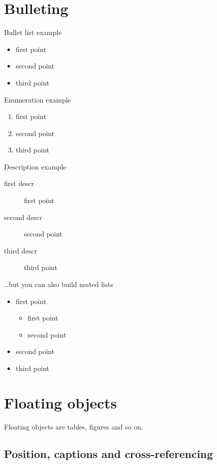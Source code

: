 \section{Bulleting}

Bullet list example
\begin{itemize}
\item first point
\item second point
\item third point \\
\end{itemize}

\noindent
Enumeration example
\begin{enumerate}
\item first point
\item second point
\item third point\\
\end{enumerate}

\noindent
Description example
\begin{description}
\item[first descr] first point
\item[second descr]  second point
\item[third descr]  third point\\
\end{description}

\noindent
\dots but you can also build nested lists
\begin{itemize}
\item first point
	\begin{itemize} %
	\item first point
	\item second point
	\end{itemize}
\item second point
\item third point \\
\end{itemize}


\section{Floating objects}

Floating objects are tables, figures and so on. 

\subsection{Position, captions and cross-referencing}


